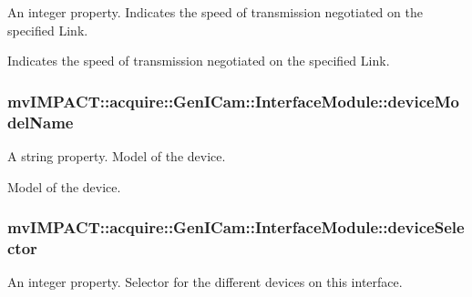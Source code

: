 An integer property. Indicates the speed of transmission negotiated on the specified Link. 

Indicates the speed of transmission negotiated on the specified Link. \hypertarget{classmv_i_m_p_a_c_t_1_1acquire_1_1_gen_i_cam_1_1_interface_module_a76e06ecae53f16c82df091d44c7516a4}{
\subsubsection[{device\+Model\+Name}]{ mv\+I\+M\+P\+A\+C\+T\+::acquire\+::\+Gen\+I\+Cam\+::\+Interface\+Module\+::device\+Model\+Name}}\label{classmv_i_m_p_a_c_t_1_1acquire_1_1_gen_i_cam_1_1_interface_module_a76e06ecae53f16c82df091d44c7516a4}


A string property. Model of the device. 

Model of the device. \hypertarget{classmv_i_m_p_a_c_t_1_1acquire_1_1_gen_i_cam_1_1_interface_module_a9cdc9d11a4b8003e4bc68ff4f47241e2}{
\subsubsection[{device\+Selector}]{ mv\+I\+M\+P\+A\+C\+T\+::acquire\+::\+Gen\+I\+Cam\+::\+Interface\+Module\+::device\+Selector}}\label{classmv_i_m_p_a_c_t_1_1acquire_1_1_gen_i_cam_1_1_interface_module_a9cdc9d11a4b8003e4bc68ff4f47241e2}


An integer property. Selector for the different devices on this interface. 

